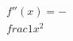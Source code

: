 \documentclass[preview]{standalone}
\begin{document}
\begin{align*}
f''(x)=-\\frac{1}{x^2}
\end{align*}
\end{document}
